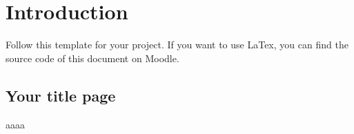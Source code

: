 \chapter{Introduction}

Follow this template for your project. If you want to use LaTex, you can find the source code of this  document on Moodle.   

\section{Your title page}
aaaa
